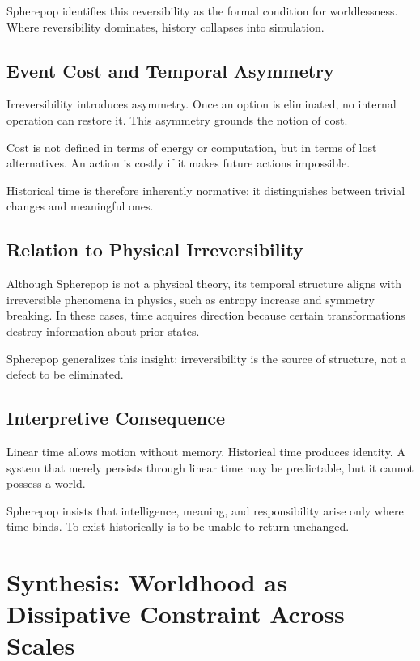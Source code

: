\documentclass[11pt]{article}
\begin{document}
Spherepop identifies this reversibility as the formal condition for worldlessness. Where reversibility dominates, history collapses into simulation.

\subsection{Event Cost and Temporal Asymmetry}

Irreversibility introduces asymmetry. Once an option is eliminated, no internal operation can restore it. This asymmetry grounds the notion of cost.

Cost is not defined in terms of energy or computation, but in terms of lost alternatives. An action is costly if it makes future actions impossible.

Historical time is therefore inherently normative: it distinguishes between trivial changes and meaningful ones.

\subsection{Relation to Physical Irreversibility}

Although Spherepop is not a physical theory, its temporal structure aligns with irreversible phenomena in physics, such as entropy increase and symmetry breaking. In these cases, time acquires direction because certain transformations destroy information about prior states.

Spherepop generalizes this insight: irreversibility is the source of structure, not a defect to be eliminated.

\subsection{Interpretive Consequence}

Linear time allows motion without memory. Historical time produces identity. A system that merely persists through linear time may be predictable, but it cannot possess a world.

Spherepop insists that intelligence, meaning, and responsibility arise only where time binds. To exist historically is to be unable to return unchanged.

\section{Synthesis: Worldhood as Dissipative Constraint Across Scales}
\end{document}
